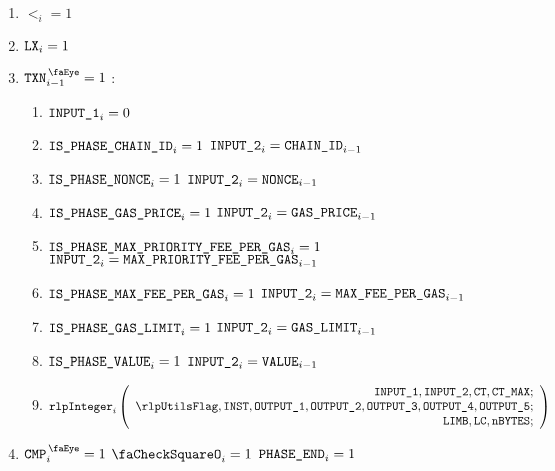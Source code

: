 \begin{center}
\end{center}

\begin{enumerate}
    \item $\lt_{i} =1$
    \item $\texttt{LX}_{i} =1$
    \item \If $\isTxn_{i-1} =1$ \Then:
        \begin{enumerate}
            \item                                             $\texttt{INPUT\_1}_{i} = 0$
            \item \If $\texttt{IS\_PHASE\_CHAIN\_ID}              _{i}=1$ \Then $\texttt{INPUT\_2} _{i} = \texttt{CHAIN\_ID}              _{i - 1}$
            \item \If $\texttt{IS\_PHASE\_NONCE}                _{i}=1$ \Then $\texttt{INPUT\_2} _{i} = \texttt{NONCE}                _{i - 1}$
            \item \If $\texttt{IS\_PHASE\_GAS\_PRICE}             _{i}=1$ \Then $\texttt{INPUT\_2} _{i} = \texttt{GAS\_PRICE}             _{i - 1}$
            \item \If $\texttt{IS\_PHASE\_MAX\_PRIORITY\_FEE\_PER\_GAS} _{i}=1$ \Then $\texttt{INPUT\_2} _{i} = \texttt{MAX\_PRIORITY\_FEE\_PER\_GAS} _{i - 1}$
            \item \If $\texttt{IS\_PHASE\_MAX\_FEE\_PER\_GAS}         _{i}=1$ \Then $\texttt{INPUT\_2} _{i} = \texttt{MAX\_FEE\_PER\_GAS}         _{i - 1}$
            \item \If $\texttt{IS\_PHASE\_GAS\_LIMIT}             _{i}=1$ \Then $\texttt{INPUT\_2} _{i} = \texttt{GAS\_LIMIT}             _{i - 1}$
            \item \If $\texttt{IS\_PHASE\_VALUE}                _{i}=1$ \Then $\texttt{INPUT\_2} _{i} = \texttt{VALUE}             _{i - 1}$
            \item
                \[
                    \rlpInteger _{i}
                    \left(
                    \begin{array}{r}
                        \inputColumn{1},
                        \inputColumn{2},
                        \ct,
                        \maxCt; \\
                        \rlpUtilsFlag,
                        \INST,
                        \outputColumn{1},
                        \outputColumn{2},
                        \outputColumn{3},
                        \outputColumn{4},
                        \outputColumn{5}; \\
                        \limb,
                        \lc,
                        \limbsize; \\
                    \end{array}
                    \right)
                \]
        \end{enumerate}
    \item \If $\isCmp_{i} =1$ \et $\done_{i}=1$ \Then $\texttt{PHASE\_END}_{i}=1$
\end{enumerate}
